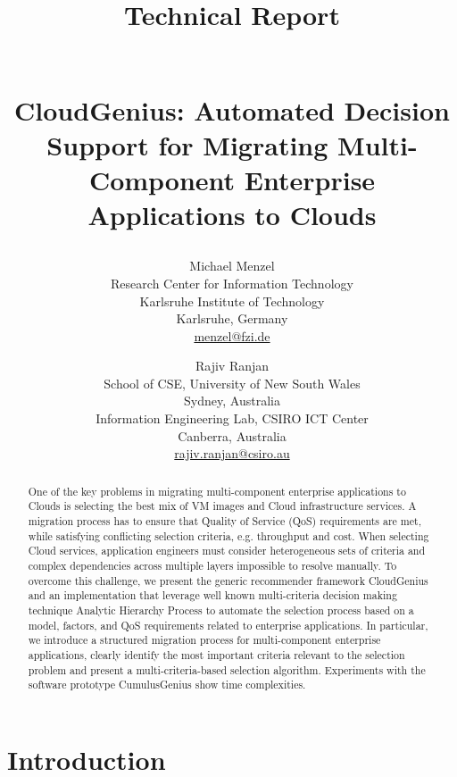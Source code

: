 \documentclass[10pt]{article}
\begin{document}
\author{
Michael Menzel\\
Research Center for Information Technology\\
Karlsruhe Institute of Technology\\
Karlsruhe, Germany\\
\url{menzel@fzi.de} 
\and 
Rajiv Ranjan\\
School of CSE, University of New South Wales\\
Sydney, Australia\\
Information Engineering Lab, CSIRO ICT Center\\
Canberra, Australia\\
\url{rajiv.ranjan@csiro.au}
}


\title{
\begin{Large}
Technical Report
\end{Large}\\
CloudGenius: Automated Decision Support for Migrating Multi-Component Enterprise Applications to Clouds}


\maketitle


\begin{abstract}
One of the key problems in migrating multi-component enterprise applications to Clouds is selecting the best mix of VM images and Cloud infrastructure services. A migration process has to ensure that Quality of Service (QoS) requirements are met, while satisfying conflicting selection criteria, e.g. throughput and cost. When selecting Cloud services, application engineers must consider heterogeneous sets of criteria and complex dependencies across multiple layers impossible to resolve manually. To overcome this challenge, we present the generic recommender framework CloudGenius and an implementation that leverage well known multi-criteria decision making technique Analytic Hierarchy Process to automate the selection process based on a model, factors, and QoS requirements related to enterprise applications. In particular, we introduce a structured migration process for multi-component enterprise applications, clearly identify the most important criteria relevant to the selection problem and present a multi-criteria-based selection algorithm. Experiments with the software prototype CumulusGenius show time complexities.
\end{abstract}


\section{Introduction}
\end{document}
